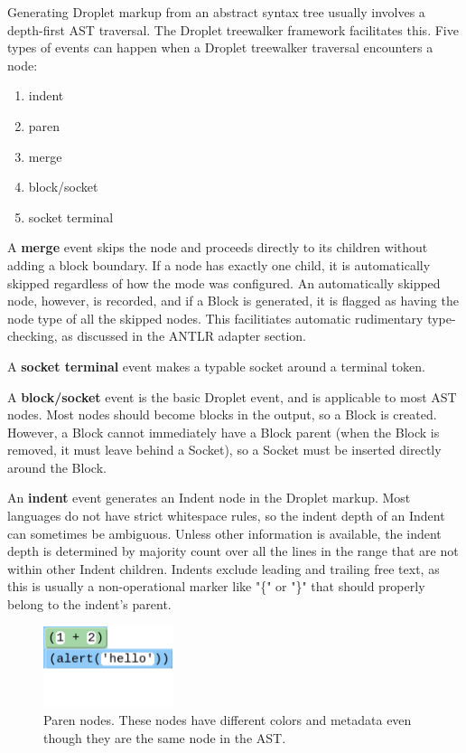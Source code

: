 \documentclass[conference]{IEEEtran}
\begin{document}
Generating Droplet markup from an abstract syntax tree usually involves a depth-first AST traversal. The Droplet treewalker framework facilitates this. Five types of events can happen when a Droplet treewalker traversal encounters a node:
\begin{enumerate}
  \item indent
  \item paren
  \item merge
  \item block/socket
  \item socket terminal
\end{enumerate}

A \textbf{merge} event skips the node and proceeds directly to its children without adding a block boundary. If a node has exactly one child, it is automatically skipped regardless of how the mode was configured. An automatically skipped node, however, is recorded, and if a Block is generated, it is flagged as having the node type of all the skipped nodes. This facilitiates automatic rudimentary type-checking, as discussed in the ANTLR adapter section.

A \textbf{socket terminal} event makes a typable socket around a terminal token.

A \textbf{block/socket} event is the basic Droplet event, and is applicable to most AST nodes. Most nodes should become blocks in the output, so a Block is created. However, a Block cannot immediately have a Block parent (when the Block is removed, it must leave behind a Socket), so a Socket must be inserted directly around the Block.

An \textbf{indent} event generates an Indent node in the Droplet markup. Most languages do not have strict whitespace rules, so the indent depth of an Indent can sometimes be ambiguous. Unless other information is available, the indent depth is determined by majority count over all the lines in the range that are not within other Indent children. Indents exclude leading and trailing free text, as this is usually a non-operational marker like "\{" or "\}" that should properly belong to the indent's parent.

\begin{figure}[!t]
\centering
\includegraphics[width=1.5in]{parenparens.png}
\caption{Paren nodes. These nodes have different colors and metadata even though they are the same node in the AST.}
\label{paren_parens}
\end{figure}
\end{document}
